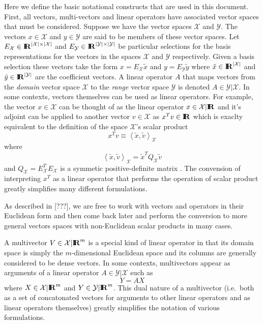 \documentclass[pdf,ps2pdf,11pt]{SANDreport}
\begin{document}
Here we define the basic notational constructs that are used in this document.
First, all vectors, multi-vectors and linear operators have associated vector
spaces that must be considered.  Suppose we have the vector spaces
$\mathcal{X}$ and $\mathcal{Y}$.  The vectors $x\in\mathcal{X}$ and
$y\in\mathcal{Y}$ are said to be members of these vector spaces.  Let
$E_{\mathcal{X}}\in\mbox{\textbf{I}}\hspace{-0.6ex}\mbox{\textbf{R}}^{|\mathcal{X}| {}\times |\mathcal{X}|}$ and
$E_{\mathcal{Y}}\in\mbox{\textbf{I}}\hspace{-0.6ex}\mbox{\textbf{R}}^{|\mathcal{Y}| {}\times |\mathcal{Y}|}$ be particular
selections for the basis representations for the vectors in the spaces
$\mathcal{X}$ and $\mathcal{Y}$ respectively.  Given a basis selection these
vectors take the form $x=E_{\mathcal{X}}\tilde{x}$ and
$y=E_{\mathcal{Y}}\tilde{y}$ where $\tilde{x}\in\mbox{\textbf{I}}\hspace{-0.6ex}\mbox{\textbf{R}}^{|\mathcal{X}|}$ and
$\tilde{y}\in\mbox{\textbf{I}}\hspace{-0.6ex}\mbox{\textbf{R}}^{|\mathcal{Y}|}$ are the coefficient vectors.  A linear
operator $A$ that maps vectors from the {}\textit{domain} vector space
$\mathcal{X}$ to the {}\textit{range} vector space $\mathcal{Y}$ is denoted
$A\in\mathcal{Y}|\mathcal{X}$.  In some contexts, vectors themselves can be
used as linear operators.  For example, the vector $x\in\mathcal{X}$ can be
thought of as the linear operator $x\in\mathcal{X}|\mbox{\textbf{I}}\hspace{-0.6ex}\mbox{\textbf{R}}$ and it's adjoint can
be applied to another vector $v\in\mathcal{X}$ as $x^T v {}\in\mbox{\textbf{I}}\hspace{-0.6ex}\mbox{\textbf{R}}$ which is
exaclty equivalent to the definition of the space $\mathcal{X}$'s scalar
product
%
\[
x^T v \equiv \left< \tilde{x}, \tilde{v} \right>_{\mathcal{X}}
\]
%
where
%
\[
\left< \tilde{x}, \tilde{v} \right>_{\mathcal{X}} = \tilde{x}^T Q_{\mathcal{X}} \tilde{v}
\]
%
and $Q_{\mathcal{X}} = E_{\mathcal{X}}^T E_{\mathcal{X}}$ is a symmetic
positive-definite matrix .  The convension of interpreting $x^T$ as a linear
operator that performs the operation of scalar product greatly simplifies many
different formulations.

As described in [???], we are free to work with vectors and operators in their
Euclidean form and then come back later and perform the conversion to more
general vectors spaces with non-Euclidean scalar products in many cases.

A multivector $V\in\mathcal{X}|\mbox{\textbf{I}}\hspace{-0.6ex}\mbox{\textbf{R}}^{m}$ is a special kind of linear operator
in that its domain space is simply the $m$-dimensional Euclidean space and its
columns are generally considered to be dense vectors.  In some contexts,
multivectors appear as arguments of a linear operator
$A\in\mathcal{Y}|\mathcal{X}$ such as
%
\[
Y = A X
\]
%
where $X\in\mathcal{X}|\mbox{\textbf{I}}\hspace{-0.6ex}\mbox{\textbf{R}}^m$ and $Y\in\mathcal{Y}|\mbox{\textbf{I}}\hspace{-0.6ex}\mbox{\textbf{R}}^m$.  This dual nature
of a multivector (i.e.\ both as a set of concatonated vectors for arguments to
other linear operators and as linear operators themselves) greatly simplifies
the notation of various formulations.
\end{document}

